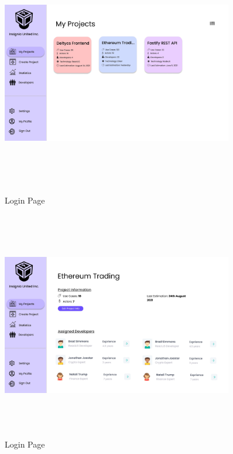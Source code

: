 \begin{figure}[H]
\includegraphics[height=10cm, width=0.9\textwidth]{./images/prototype/0003}
\centering 
\caption{Login Page}
\label{fig:prototype1}

\includegraphics[height=10cm, width=0.9\textwidth]{./images/prototype/0004}
\centering 
\caption{Login Page}
\label{fig:prototype1}

\pagebreak



\end{figure}
